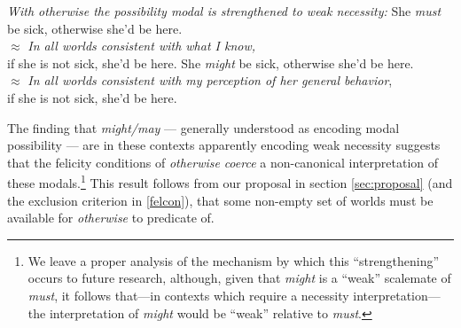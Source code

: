 \pex  \textit{With \emph{otherwise} the possibility modal is strengthened to weak necessity:}
\a  She \textit{must} be sick, otherwise she'd be here.\\
$\approx$ \textit{In all worlds consistent with what I know,}\\ \hspace*{0.7em} if she is not sick, she'd be here. 
\a  She \textit{might} be sick, otherwise she'd be here.\\
$\approx$ \textit{In all worlds consistent with my perception of her general behavior},\\ \hspace*{0.7em} if she is not sick, she'd be here.\xe

The finding that \textit{might/may} --- generally understood as encoding modal possibility --- are in these contexts apparently encoding weak necessity suggests that the felicity conditions of \textit{otherwise} \textit{coerce} a non-canonical interpretation of these modals.\footnote{We leave a proper analysis of the mechanism by which this ``strengthening'' occurs to future research, although, %
	given that \textit{might} is a ``weak'' scalemate of \textit{must}, it follows that---in contexts which require a necessity interpretation---the interpretation of \textit{might} would be ``weak'' relative to \textit{must}.} This result follows from our proposal in section \ref{sec:proposal} (and the exclusion criterion in \ref{felcon}), that some non-empty set of worlds must be available for \textit{otherwise} to predicate of. %

